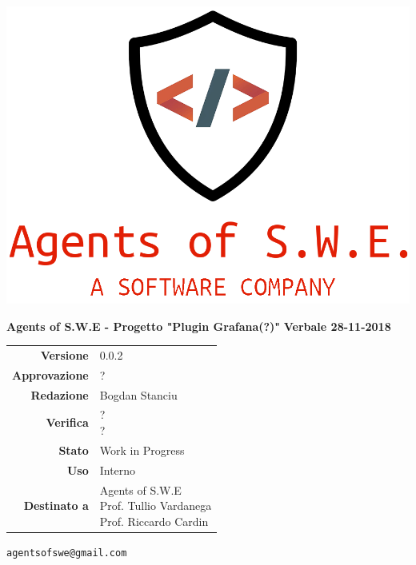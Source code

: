 


\begin{titlepage}
\thispagestyle{empty}

\begin{center}
\includegraphics[scale=0.3]{./images/logo.png} 


\large \textbf{Agents of S.W.E - Progetto "Plugin Grafana(?)"}
\vfill
\Huge \textbf{Verbale 28-11-2018}
\vfill
\large
\renewcommand{\arraystretch}{1.3}
\begin{tabular}{r|l}
\textbf{Versione} & 0.0.2\\
\textbf{Approvazione} & ?\\
\textbf{Redazione} & \parbox[t]{5cm}{Bogdan Stanciu}\\
\textbf{Verifica} & \parbox[t]{5cm}{?\\?}\\
\textbf{Stato} & Work in Progress\\
\textbf{Uso} & Interno\\
\textbf{Destinato a} & \parbox[t]{5cm}{Agents of S.W.E \\Prof. Tullio Vardanega\\Prof. Riccardo Cardin}
\end{tabular}
\vfill
\small
\texttt{agentsofswe@gmail.com}
\end{center}
\end{titlepage}

\pagebreak















